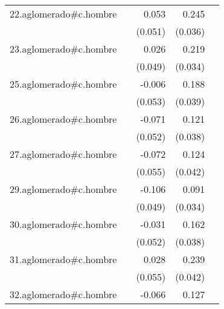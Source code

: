 {\begin{longtable}{l*{4}{D{.}{.}{-1}}}
\addlinespace
22.aglomerado#c.hombre&                     &       0.053         &       0.245\sym{***}&                     \\
            &                     &     (0.051)         &     (0.036)         &                     \\
\addlinespace
23.aglomerado#c.hombre&                     &       0.026         &       0.219\sym{***}&                     \\
            &                     &     (0.049)         &     (0.034)         &                     \\
\addlinespace
25.aglomerado#c.hombre&                     &      -0.006         &       0.188\sym{***}&                     \\
            &                     &     (0.053)         &     (0.039)         &                     \\
\addlinespace
26.aglomerado#c.hombre&                     &      -0.071         &       0.121\sym{**} &                     \\
            &                     &     (0.052)         &     (0.038)         &                     \\
\addlinespace
27.aglomerado#c.hombre&                     &      -0.072         &       0.124\sym{**} &                     \\
            &                     &     (0.055)         &     (0.042)         &                     \\
\addlinespace
29.aglomerado#c.hombre&                     &      -0.106\sym{*}  &       0.091\sym{**} &                     \\
            &                     &     (0.049)         &     (0.034)         &                     \\
\addlinespace
30.aglomerado#c.hombre&                     &      -0.031         &       0.162\sym{***}&                     \\
            &                     &     (0.052)         &     (0.038)         &                     \\
\addlinespace
31.aglomerado#c.hombre&                     &       0.028         &       0.239\sym{***}&                     \\
            &                     &     (0.055)         &     (0.042)         &                     \\
\addlinespace
32.aglomerado#c.hombre&                     &      -0.066         &       0.127\sym{***}&                     \\

\end{longtable}}
